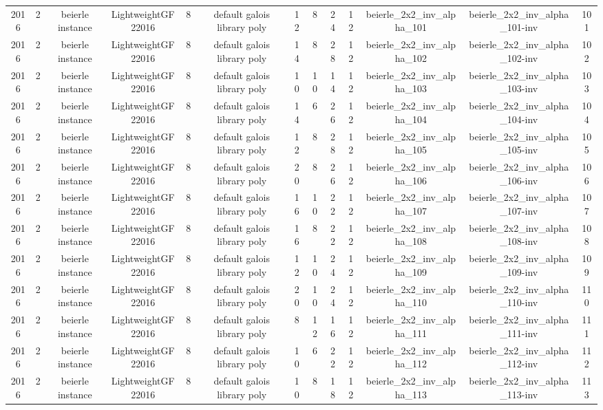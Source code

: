 \begin{tabular}{c c c c c c c c c c c c c}
2016 & 2 & beierle instance & LightweightGF22016 & 8 & default galois library poly & 12 & 8 & 24 & 12 & beierle_2x2_inv_alpha_101 & beierle_2x2_inv_alpha_101-inv & 101 \\
2016 & 2 & beierle instance & LightweightGF22016 & 8 & default galois library poly & 14 & 8 & 28 & 12 & beierle_2x2_inv_alpha_102 & beierle_2x2_inv_alpha_102-inv & 102 \\
2016 & 2 & beierle instance & LightweightGF22016 & 8 & default galois library poly & 10 & 10 & 14 & 12 & beierle_2x2_inv_alpha_103 & beierle_2x2_inv_alpha_103-inv & 103 \\
2016 & 2 & beierle instance & LightweightGF22016 & 8 & default galois library poly & 14 & 6 & 26 & 12 & beierle_2x2_inv_alpha_104 & beierle_2x2_inv_alpha_104-inv & 104 \\
2016 & 2 & beierle instance & LightweightGF22016 & 8 & default galois library poly & 12 & 8 & 28 & 12 & beierle_2x2_inv_alpha_105 & beierle_2x2_inv_alpha_105-inv & 105 \\
2016 & 2 & beierle instance & LightweightGF22016 & 8 & default galois library poly & 20 & 8 & 26 & 12 & beierle_2x2_inv_alpha_106 & beierle_2x2_inv_alpha_106-inv & 106 \\
2016 & 2 & beierle instance & LightweightGF22016 & 8 & default galois library poly & 16 & 10 & 22 & 12 & beierle_2x2_inv_alpha_107 & beierle_2x2_inv_alpha_107-inv & 107 \\
2016 & 2 & beierle instance & LightweightGF22016 & 8 & default galois library poly & 16 & 8 & 22 & 12 & beierle_2x2_inv_alpha_108 & beierle_2x2_inv_alpha_108-inv & 108 \\
2016 & 2 & beierle instance & LightweightGF22016 & 8 & default galois library poly & 12 & 10 & 24 & 12 & beierle_2x2_inv_alpha_109 & beierle_2x2_inv_alpha_109-inv & 109 \\
2016 & 2 & beierle instance & LightweightGF22016 & 8 & default galois library poly & 20 & 10 & 24 & 12 & beierle_2x2_inv_alpha_110 & beierle_2x2_inv_alpha_110-inv & 110 \\
2016 & 2 & beierle instance & LightweightGF22016 & 8 & default galois library poly & 8 & 12 & 16 & 12 & beierle_2x2_inv_alpha_111 & beierle_2x2_inv_alpha_111-inv & 111 \\
2016 & 2 & beierle instance & LightweightGF22016 & 8 & default galois library poly & 10 & 6 & 22 & 12 & beierle_2x2_inv_alpha_112 & beierle_2x2_inv_alpha_112-inv & 112 \\
2016 & 2 & beierle instance & LightweightGF22016 & 8 & default galois library poly & 10 & 8 & 18 & 12 & beierle_2x2_inv_alpha_113 & beierle_2x2_inv_alpha_113-inv & 113 \\

\end{tabular}
